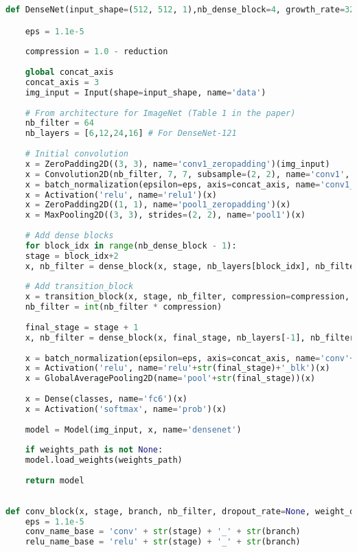 \begin{lstlisting}[language=Python]
def DenseNet(input_shape=(512, 512, 1),nb_dense_block=4, growth_rate=32, nb_filter=64, reduction=0.0, dropout_rate=0.0, weight_decay=1e-4, classes=1000, weights_path=None):

	eps = 1.1e-5
	
	compression = 1.0 - reduction
	
	global concat_axis
	concat_axis = 3
	img_input = Input(shape=input_shape, name='data')
	
	# From architecture for ImageNet (Table 1 in the paper)
	nb_filter = 64
	nb_layers = [6,12,24,16] # For DenseNet-121
	
	# Initial convolution
	x = ZeroPadding2D((3, 3), name='conv1_zeropadding')(img_input)
	x = Convolution2D(nb_filter, 7, 7, subsample=(2, 2), name='conv1', bias=False)(x)
	x = batch_normalization(epsilon=eps, axis=concat_axis, name='conv1_bn')(x)
	x = Activation('relu', name='relu1')(x)
	x = ZeroPadding2D((1, 1), name='pool1_zeropadding')(x)
	x = MaxPooling2D((3, 3), strides=(2, 2), name='pool1')(x)
	
	# Add dense blocks
	for block_idx in range(nb_dense_block - 1):
	stage = block_idx+2
	x, nb_filter = dense_block(x, stage, nb_layers[block_idx], nb_filter, growth_rate, dropout_rate=dropout_rate, weight_decay=weight_decay)
	
	# Add transition_block
	x = transition_block(x, stage, nb_filter, compression=compression, dropout_rate=dropout_rate, weight_decay=weight_decay)
	nb_filter = int(nb_filter * compression)
	
	final_stage = stage + 1
	x, nb_filter = dense_block(x, final_stage, nb_layers[-1], nb_filter, growth_rate, dropout_rate=dropout_rate, weight_decay=weight_decay)
	
	x = batch_normalization(epsilon=eps, axis=concat_axis, name='conv'+str(final_stage)+'_blk_bn')(x)
	x = Activation('relu', name='relu'+str(final_stage)+'_blk')(x)
	x = GlobalAveragePooling2D(name='pool'+str(final_stage))(x)
	
	x = Dense(classes, name='fc6')(x)
	x = Activation('softmax', name='prob')(x)
	
	model = Model(img_input, x, name='densenet')
	
	if weights_path is not None:
	model.load_weights(weights_path)
	
	return model
	
	
def conv_block(x, stage, branch, nb_filter, dropout_rate=None, weight_decay=1e-4):
	eps = 1.1e-5
	conv_name_base = 'conv' + str(stage) + '_' + str(branch)
	relu_name_base = 'relu' + str(stage) + '_' + str(branch)
	

\end{lstlisting}
